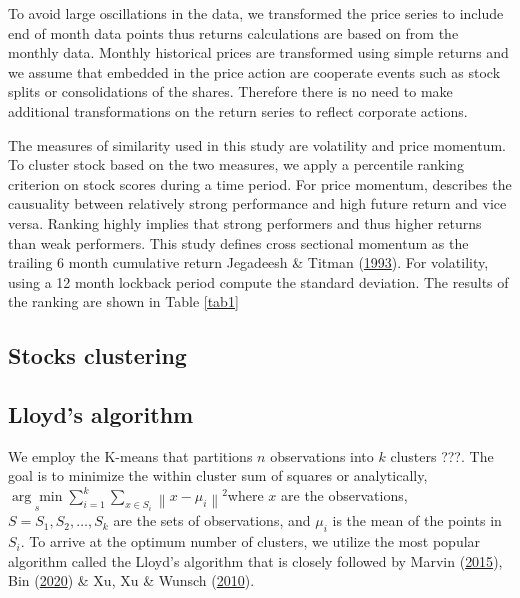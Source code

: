 \documentclass[11pt,preprint, authoryear]{elsarticle}
\numberwithin{equation}{section}
\numberwithin{figure}{section}
\numberwithin{table}{section}
\begin{document}
To avoid large oscillations in the data, we transformed the price series
to include end of month data points thus returns calculations are based
on from the monthly data. Monthly historical prices are transformed
using simple returns and we assume that embedded in the price action are
cooperate events such as stock splits or consolidations of the shares.
Therefore there is no need to make additional transformations on the
return series to reflect corporate actions.

The measures of similarity used in this study are volatility and price
momentum. To cluster stock based on the two measures, we apply a
percentile ranking criterion on stock scores during a time period. For
price momentum, describes the causuality between relatively strong
performance and high future return and vice versa. Ranking highly
implies that strong performers and thus higher returns than weak
performers. This study defines cross sectional momentum as the trailing
6 month cumulative return Jegadeesh \& Titman
(\protect\hyperlink{ref-jegadeesh1993returns}{1993}). For volatility,
using a 12 month lockback period compute the standard deviation. The
results of the ranking are shown in Table \ref{tab1}

\hypertarget{stocks-clustering}{%
\subsection{Stocks clustering}\label{stocks-clustering}}

\hypertarget{lloyds-algorithm}{%
\subsection{Lloyd's algorithm}\label{lloyds-algorithm}}

We employ the K-means that partitions \(n\) observations into \(k\)
clusters ???. The goal is to minimize the within cluster sum of squares
or analytically,
\(\underset{s}{\arg \min } \sum_{i=1}^k \sum_{x \in S_i}\left\|x-\mu_i\right\|^2\)where
\(x\) are the observations, \(S=S_1, S_2, \ldots, S_k\) are the sets of
observations, and \(\mu_i\) is the mean of the points in \(S_i\). To
arrive at the optimum number of clusters, we utilize the most popular
algorithm called the Lloyd's algorithm that is closely followed by
Marvin (\protect\hyperlink{ref-marvin2015creating}{2015}), Bin
(\protect\hyperlink{ref-bin2020k}{2020}) \& Xu, Xu \& Wunsch
(\protect\hyperlink{ref-xu2010clustering}{2010}).
\end{document}
